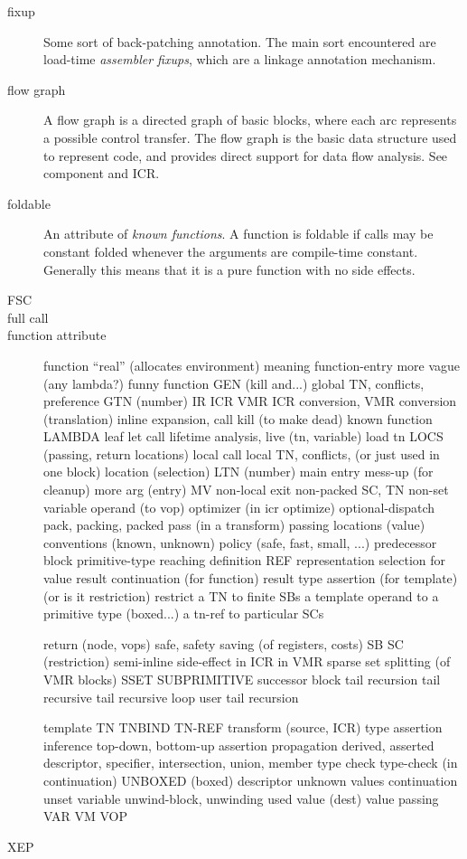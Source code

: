 \begin{description}
\item[fixup]  Some sort of back-patching annotation.  The main sort encountered
are load-time {\it assembler fixups}, which are a linkage annotation mechanism.

\item[flow graph] A flow graph is a directed graph of basic blocks, where each
arc represents a possible control transfer.  The flow graph is the basic data
structure used to represent code, and provides direct support for data flow
analysis.  See component and ICR.

\item[foldable] An attribute of {\it known functions}.  A function is foldable
if calls may be constant folded whenever the arguments are compile-time
constant.  Generally this means that it is a pure function with no side
effects.


\item[FSC]
\item[full call]
\item[function attribute]
function
        ``real'' (allocates environment)
        meaning function-entry
        more vague (any lambda?)
funny function
GEN (kill and...)
global TN, conflicts, preference
GTN (number)
IR ICR VMR  ICR conversion, VMR conversion (translation)
inline expansion, call
kill (to make dead)
known function
LAMBDA
leaf
let call
lifetime analysis, live (tn, variable)
load tn
LOCS (passing, return locations)
local call
local TN, conflicts, (or just used in one block)
location (selection)
LTN (number)
main entry
mess-up (for cleanup)
more arg (entry)
MV
non-local exit
non-packed SC, TN
non-set variable
operand (to vop)
optimizer (in icr optimize)
optional-dispatch
pack, packing, packed
pass (in a transform)
passing 
        locations (value)
        conventions (known, unknown)
policy (safe, fast, small, ...)
predecessor block
primitive-type
reaching definition
REF
representation
        selection
        for value
result continuation (for function)
result type assertion (for template) (or is it restriction)
restrict
        a TN to finite SBs
        a template operand to a primitive type (boxed...)
        a tn-ref to particular SCs

return (node, vops)
safe, safety
saving (of registers, costs)
SB
SC (restriction)
semi-inline
side-effect
        in ICR
        in VMR
sparse set
splitting (of VMR blocks)
SSET
SUBPRIMITIVE
successor block
tail recursion
        tail recursive
        tail recursive loop
        user tail recursion

template
TN
TNBIND
TN-REF
transform (source, ICR)
type
        assertion
        inference
                top-down, bottom-up
        assertion propagation
        derived, asserted
        descriptor, specifier, intersection, union, member type
        check
type-check (in continuation)
UNBOXED (boxed) descriptor
unknown values continuation
unset variable
unwind-block, unwinding
used value (dest)
value passing
VAR
VM
VOP
\item[XEP]

\end{description}
